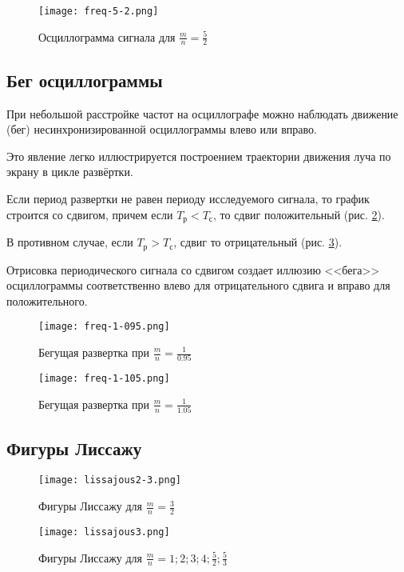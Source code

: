 \begin{figure}[H]
	\centering
	\texttt{[image: freq-5-2.png]}
	\caption{Осциллограмма сигнала для $\frac{m}{n}=\frac{5}{2}$}
	\label{fig:freq-5-2}
\end{figure}


\subsection{Бег осциллограммы}
\def\Tr{T_\text{р}}
\def\Ts{T_\text{с}}
При небольшой расстройке частот на осциллографе можно наблюдать движение (бег) несинхронизированной осциллограммы влево или вправо. 

Это явление легко иллюстрируется построением траектории движения луча по экрану в цикле развёртки. 

Если период развертки не равен периоду исследуемого сигнала, то график строится со сдвигом, причем если $\Tr<\Ts$, то сдвиг положительный (рис. \ref{fig:freq-1-0.95}).

В противном случае, если $\Tr>\Ts$, сдвиг то отрицательный  (рис. \ref{fig:freq-1-1.05}).

Отрисовка периодического сигнала со сдвигом создает иллюзию <<бега>> осциллограммы соответственно влево для отрицательного сдвига и вправо для положительного.

\begin{figure}[H]
	\centering
	\texttt{[image: freq-1-095.png]}
	\caption{Бегущая развертка при $\frac{m}{n}=\frac{1}{0.95}$}
	\label{fig:freq-1-0.95}
\end{figure}
\begin{figure}[H]
	\centering
	\texttt{[image: freq-1-105.png]}
	\caption{Бегущая развертка при $\frac{m}{n}=\frac{1}{1.05}$}
	\label{fig:freq-1-1.05}
\end{figure}
\subsection{Фигуры Лиссажу}
\begin{figure}[H]
	\centering
	\texttt{[image: lissajous2-3.png]}
	\caption{Фигуры Лиссажу для $\frac{m}{n}=\frac{3}{2}$}
	\label{fig:lissajous-2}
\end{figure}
\begin{figure}[H]
	\centering
	\texttt{[image: lissajous3.png]}
	\caption{Фигуры Лиссажу для $\frac{m}{n}=1;2;3;4;\frac{5}{2};\frac{5}{3}$}
	\label{fig:lissajous-1}
\end{figure}